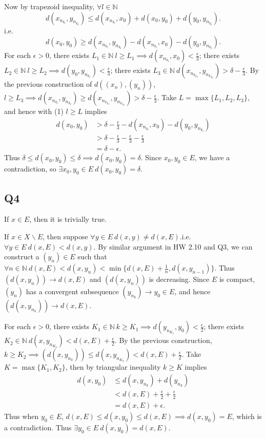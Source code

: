 \documentclass[12pt,lettersize]{article}
\newcommand{\N}{\mathbb{N}}
\begin{document}
	Now by trapezoid inequality, $\forall l\in\N$
	\begin{displaymath}
		d(x_{n_{k_l}},y_{n_{k_l}})\leq d(x_{n_{k_l}},x_0)+d(x_0,y_0)+d(y_0,y_{n_{k_l}}).
	\end{displaymath}
	i.e.
	\begin{equation}
		d(x_0,y_0)\geq d(x_{n_{k_l}},y_{n_{k_l}})-d(x_{n_{k_l}},x_0)-d(y_0,y_{n_{k_l}}).
	\end{equation}
	For each $\epsilon>0$, there exists $L_1\in\N\ l\geq L_1\implies d(x_{n_{k_l}},x_0)<\frac{\epsilon}{3}$; there exists $L_2\in\N\ l\geq L_2\implies d(y_0,y_{n_{k_l}})<\frac{\epsilon}{3}$; there exists $L_3\in\N\ d(x_{n_{k_{L_3}}},y_{n_{k_{L_3}}})>\delta-\frac{\epsilon}{3}$. By the previous construction of $d((x_n),(y_n))$, $l\geq L_3\implies d(x_{n_{k_{l}}},y_{n_{k_{l}}})\geq d(x_{n_{k_{L_3}}},y_{n_{k_{L_3}}})>\delta-\frac{\epsilon}{3}$. Take $L=\max\{L_1,L_2,L_3\}$, and hence with (1) $l\geq L$ implies
	\begin{align*}
		d(x_0,y_0)&>\delta-\frac{\epsilon}{3}-d(x_{n_{k_l}},x_0)-d(y_0,y_{n_{k_l}})\\
				  &>\delta-\frac{\epsilon}{3}-\frac{\epsilon}{3}-\frac{\epsilon}{3}\\
				  &=\delta-\epsilon.
	\end{align*}
	Thus $\delta\leq d(x_0,y_0)\leq\delta\implies d(x_0,y_0)=\delta$. Since $x_0,y_0\in E$, we have a contradiction, so $\exists x_0,y_0\in E\ d(x_0,y_0)=\delta$.
	\newpage
	
	\setcounter{equation}{0}
	\subsection*{Q4}
	If $x\in E$, then it is trivially true.\smallskip
	
	If $x\in X\backslash E$, then suppose $\forall y\in E\ d(x,y)\neq d(x,E)$.i.e. $\forall y\in E\ d(x,E)<d(x,y)$. By similar argument in HW 2.10 and Q3, we can construct a $(y_n)\in E$ such that $\forall n\in\N\ d(x,E)<d(x,y_n)<\min\{d(x,E)+\frac{1}{n}, d(x,y_{n-1})\}$. Thus $(d(x,y_n))\rightarrow d(x,E)$ and $(d(x,y_n))$ is decreasing. Since $E$ is compact, $(y_n)$ has a convergent subsequence $(y_{n_k})\rightarrow y_0\in E$, and hence $(d(x,y_{n_k}))\rightarrow d(x,E)$. 
	
	For each $\epsilon>0$, there exists $K_1\in\N\ k\geq K_1\implies d(y_{n_{K_1}},y_0)<\frac{\epsilon}{2}$; there exists $K_2\in\N\ d(x,y_{n_{K_2}})<d(x,E)+\frac{\epsilon}{2}$. By the previous construction, $k\geq K_2\implies (d(x,y_{n_k}))\leq d(x,y_{n_{K_2}})<d(x,E)+\frac{\epsilon}{2}$. Take $K=\max\{K_1,K_2\}$, then by triangular inequality $k\geq K$ implies
	\begin{align}
		d(x,y_0) &\leq d(x,y_{n_k})+d(y_{n_k})\\
				 &<d(x,E)+\frac{\epsilon}{2}+\frac{\epsilon}{2}\\
				 &=d(x,E)+\epsilon.
	\end{align}
	Thus when $y_0\in E$, $d(x,E)\leq d(x,y_0)\leq d(x,E)\implies d(x,y_0)=E$, which is a contradiction. Thus $\exists y_0\in E\ d(x,y_0)=d(x,E)$.
	\newpage
	
\end{document}
